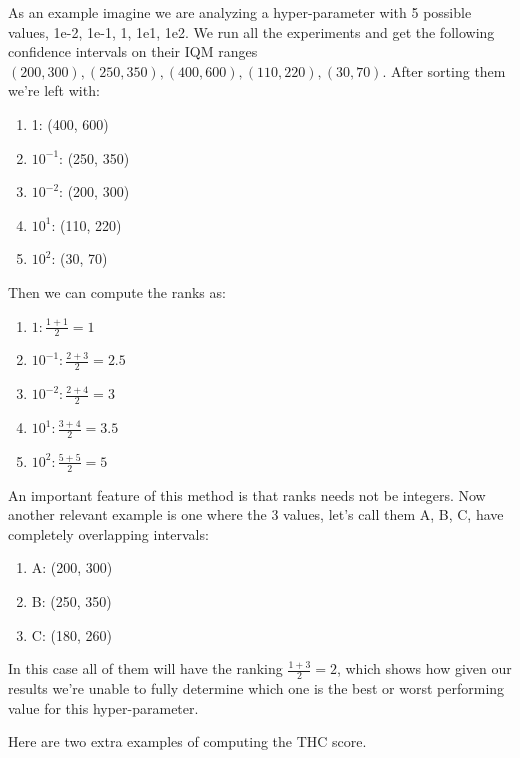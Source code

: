 \documentclass[10pt]{article} %
\begin{document}
As an example imagine we are analyzing a hyper-parameter with 5 possible values, 1e-2, 1e-1, 1, 1e1, 1e2. We run all the experiments and get the following confidence intervals on their IQM ranges $(200, 300), (250, 350), (400, 600), (110, 220), (30, 70)$. 
After sorting them we're left with: 
\begin{enumerate}
    \item 1: (400, 600)
    \item $10^{-1}$: (250, 350)
    \item $10^{-2}$: (200, 300)
    \item $10^1$: (110, 220)
    \item $10^2$: (30, 70)
\end{enumerate}
Then we can compute the ranks as: 
\begin{enumerate}
    \item $1: \frac{1 + 1}{2} = 1$
    \item $10^{-1}: \frac{2 + 3}{2} = 2.5$
    \item $10^{-2}: \frac{2 + 4}{2} = 3$
    \item $10^1: \frac{3 + 4}{2} = 3.5$
    \item $10^2: \frac{5 + 5}{2} = 5$
\end{enumerate}
An important feature of this method is that ranks needs not be integers. Now another relevant example is one where the 3 values, let's call them A, B, C, have completely overlapping intervals: \begin{enumerate}
    \item A: (200, 300)
    \item B: (250, 350)
    \item C: (180, 260)
\end{enumerate}
In this case all of them will have the ranking $\frac{1+3}{2} = 2$, which shows how given our results we're unable to fully determine which one is the best or worst performing value for this hyper-parameter. 

Here are two extra examples of computing the THC score.
\end{document}
